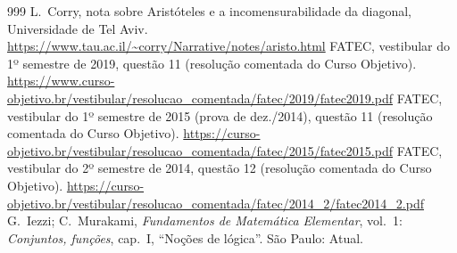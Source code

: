 \begin{thebibliography}{999}
 L.~Corry, nota sobre Aristóteles e a incomensurabilidade da diagonal, Universidade de Tel Aviv. \url{https://www.tau.ac.il/~corry/Narrative/notes/aristo.html}
 FATEC, vestibular do 1º semestre de 2019, questão 11 (resolução comentada do Curso Objetivo). \url{https://www.curso-objetivo.br/vestibular/resolucao_comentada/fatec/2019/fatec2019.pdf}
 FATEC, vestibular do 1º semestre de 2015 (prova de dez./2014), questão 11 (resolução comentada do Curso Objetivo). \url{https://curso-objetivo.br/vestibular/resolucao_comentada/fatec/2015/fatec2015.pdf}
 FATEC, vestibular do 2º semestre de 2014, questão 12 (resolução comentada do Curso Objetivo). \url{https://curso-objetivo.br/vestibular/resolucao_comentada/fatec/2014_2/fatec2014_2.pdf}
 G.~Iezzi; C.~Murakami, \emph{Fundamentos de Matemática Elementar}, vol.~1: \emph{Conjuntos, funções}, cap.~I, \enquote{Noções de lógica}. São Paulo: Atual.
\end{thebibliography}
\endgroup
